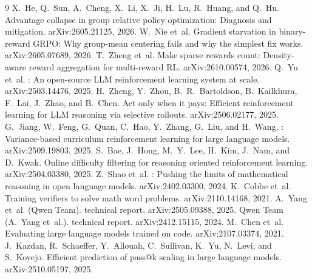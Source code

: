 \documentclass[11pt]{article}
\begin{document}

\begin{thebibliography}{9}
X.~He, Q.~Sun, A.~Cheng, X.~Li, X.~Ji, H.~Lu, R.~Huang, and Q.~Hu.
\newblock Advantage collapse in group relative policy optimization: Diagnosis and mitigation.
\newblock arXiv:2605.21125, 2026.
W.~Nie et~al.
\newblock Gradient starvation in binary-reward {GRPO}: Why group-mean centering fails and why the simplest fix works.
\newblock arXiv:2605.07689, 2026.
T.~Zheng et~al.
\newblock Make sparse rewards count: Density-aware reward aggregation for multi-reward {RL}.
\newblock arXiv:2610.00574, 2026.
Q.~Yu et~al.
: An open-source {LLM} reinforcement learning system at scale.
\newblock arXiv:2503.14476, 2025.
H.~Zheng, Y.~Zhou, B.~R.~Bartoldson, B.~Kailkhura, F.~Lai, J.~Zhao, and B.~Chen.
\newblock Act only when it pays: Efficient reinforcement learning for {LLM} reasoning via selective rollouts.
\newblock arXiv:2506.02177, 2025.
G.~Jiang, W.~Feng, G.~Quan, C.~Hao, Y.~Zhang, G.~Liu, and H.~Wang.
: Variance-based curriculum reinforcement learning for large language models.
\newblock arXiv:2509.19803, 2025.
S.~Bae, J.~Hong, M.~Y.~Lee, H.~Kim, J.~Nam, and D.~Kwak.
\newblock Online difficulty filtering for reasoning oriented reinforcement learning.
\newblock arXiv:2504.03380, 2025.
Z.~Shao et~al.
: Pushing the limits of mathematical reasoning in open language models.
\newblock arXiv:2402.03300, 2024.
K.~Cobbe et~al.
\newblock Training verifiers to solve math word problems.
\newblock arXiv:2110.14168, 2021.
A.~Yang et~al. (Qwen Team).
 technical report.
\newblock arXiv:2505.09388, 2025.
Qwen Team (A.~Yang et~al.).
 technical report.
\newblock arXiv:2412.15115, 2024.
M.~Chen et~al.
\newblock Evaluating large language models trained on code.
\newblock arXiv:2107.03374, 2021.
J.~Kazdan, R.~Schaeffer, Y.~Allouah, C.~Sullivan, K.~Yu, N.~Levi, and S.~Koyejo.
\newblock Efficient prediction of pass@k scaling in large language models.
\newblock arXiv:2510.05197, 2025.
\end{thebibliography}
\end{document}
